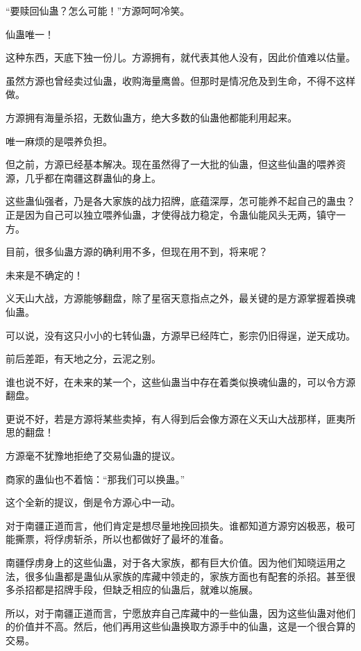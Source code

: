
\begin{this_body}

“要赎回仙蛊？怎么可能！”方源呵呵冷笑。

仙蛊唯一！

这种东西，天底下独一份儿。方源拥有，就代表其他人没有，因此价值难以估量。

虽然方源也曾经卖过仙蛊，收购海量鹰兽。但那时是情况危及到生命，不得不这样做。

方源拥有海量杀招，无数仙蛊方，绝大多数的仙蛊他都能利用起来。

唯一麻烦的是喂养负担。

但之前，方源已经基本解决。现在虽然得了一大批的仙蛊，但这些仙蛊的喂养资源，几乎都在南疆这群蛊仙的身上。

这些蛊仙强者，乃是各大家族的战力招牌，底蕴深厚，怎可能养不起自己的蛊虫？正是因为自己可以独立喂养仙蛊，才使得战力稳定，令蛊仙能风头无两，镇守一方。

目前，很多仙蛊方源的确利用不多，但现在用不到，将来呢？

未来是不确定的！

义天山大战，方源能够翻盘，除了星宿天意指点之外，最关键的是方源掌握着换魂仙蛊。

可以说，没有这只小小的七转仙蛊，方源早已经阵亡，影宗仍旧得逞，逆天成功。

前后差距，有天地之分，云泥之别。

谁也说不好，在未来的某一个，这些仙蛊当中存在着类似换魂仙蛊的，可以令方源翻盘。

更说不好，若是方源将某些卖掉，有人得到后会像方源在义天山大战那样，匪夷所思的翻盘！

方源毫不犹豫地拒绝了交易仙蛊的提议。

商家的蛊仙也不着恼：“那我们可以换蛊。”

这个全新的提议，倒是令方源心中一动。

对于南疆正道而言，他们肯定是想尽量地挽回损失。谁都知道方源穷凶极恶，极可能撕票，将俘虏斩杀，所以也都做好了最坏的准备。

南疆俘虏身上的这些仙蛊，对于各大家族，都有巨大价值。因为他们知晓运用之法，很多仙蛊都是蛊仙从家族的库藏中领走的，家族方面也有配套的杀招。甚至很多杀招都是招牌手段，但缺乏相应的仙蛊后，就难以施展。

所以，对于南疆正道而言，宁愿放弃自己库藏中的一些仙蛊，因为这些仙蛊对他们的价值并不高。然后，他们再用这些仙蛊换取方源手中的仙蛊，这是一个很合算的交易。


\end{this_body}
